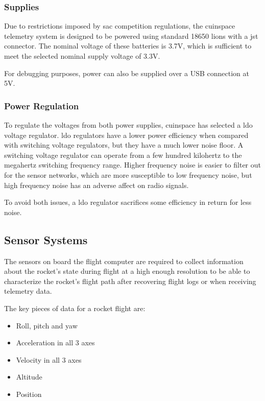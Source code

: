 \subsubsection{Supplies}

Due to restrictions imposed by \gls{sac} competition regulations, the \gls{cuinspace} telemetry system is designed to
be powered using standard 18650 \glspl{lion} with a \gls{jst} connector. The nominal voltage of these batteries is
3.7V, which is sufficient to meet the selected nominal supply voltage of 3.3V.

For debugging purposes, power can also be supplied over a USB connection at 5V.

\subsubsection{Power Regulation}

To regulate the voltages from both power supplies, \gls{cuinspace} has selected a \gls{ldo} voltage regulator.
\gls{ldo} regulators have a lower power efficiency when compared with switching voltage regulators, but they have a
much lower noise floor. A switching voltage regulator can operate from a few hundred kilohertz to the megahertz
switching frequency range. Higher frequency noise is easier to filter out for the sensor networks, which are more
susceptible to low frequency noise, but high frequency noise has an adverse affect on radio signals.

To avoid both issues, a \gls{ldo} regulator sacrifices some efficiency in return for less noise.

\subsection{Sensor Systems}

The sensors on board the flight computer are required to collect information about the rocket's state during flight at
a high enough resolution to be able to characterize the rocket's flight path after recovering flight logs or when
receiving telemetry data.

The key pieces of data for a rocket flight are:

\begin{itemize}
    \item Roll, pitch and yaw
    \item Acceleration in all 3 axes
    \item Velocity in all 3 axes
    \item Altitude
    \item Position
\end{itemize}

